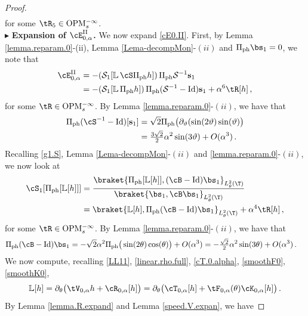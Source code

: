 \documentclass[a4paper,reqno,10pt]{article}
\newcommand{\pa}{\partial}
\newcommand{\OpM}{{\rm O}{\rm P}{\rm M}}
\newcommand{\LL}{\mathbb{L}}
\begin{document}
\begin{proof}
\begin{align}
		\end{align}
		for some $\tR_5\in\OpM_{s}^{-\infty}$. 
\\[1mm]
\noindent  $\blacktriangleright$ {\bf Expansion of $\cE_{0,\alpha}^{\rm II}$.} We now expand \eqref{cE0.II}. First, by Lemma \ref{lemma.reparam.0}-(ii), Lemma \ref{Lema-decompMon}-$(ii)$ and $\Pi_{\rm ph}\bs_{1}=0$, we note that
\begin{align}
   \cE_{0,\alpha}^{\rm II} & =- (\mathcal{S}_1[\mathbb{L}\, \cS \Pi_{\rm ph}h])\,\Pi_{\rm ph}\mathcal{S}^{-1}\mathbf{s}_1\\
   & = -(\mathcal{S}_1[\mathbb{L}\,  \Pi_{\rm ph}h])\,\Pi_{\rm ph}(\mathcal{S}^{-1}-\hbox{Id})\mathbf{s}_1+\alpha^6 \tR[h] \,, \label{II.cE}
\end{align}
for some $\tR \in\OpM_{s}^{-\infty}$. By Lemma \ref{lemma.reparam.0}-$(ii)$, we have that
    \begin{align}
      \Pi_{\rm ph}(\cS^{-1}-{\rm Id})[\mathbf{s}_1] & = \sqrt 2\Pi_{\rm ph} \big( \pa_{\vartheta} (\sin(2\vartheta)\sin(\vartheta) \big)\\
      &=\tfrac{3\sqrt{2}}{2}\alpha^2\sin(3\vartheta) +O(\alpha^3)\,. \label{SSLL1}
    \end{align}
Recalling \eqref{g1.S}, Lemma \ref{Lema-decompMon}-$(ii)$ and \ref{lemma.reparam.0}-$(ii)$, we now look at
\begin{align}
    \cS_{1}[\Pi_{\rm ph}[\LL[h]]] & =  \frac{\braket{\Pi_{\rm ph}[\LL[h]], (\cB-{\rm Id})\bs_{1}}_{L_\theta^2(\T)}}{\braket{\bs_{1},\cB \bs_{1}}_{L_\theta^2(\T)}}  \\
    & =  \braket{\LL[h], \Pi_{\rm ph}(\cB-{\rm Id})\bs_{1}}_{L_\theta^2(\T)} + \alpha^4 \tR[h] \,, \label{cS1.expand}
\end{align}
for some $\tR \in\OpM_{s}^{-\infty}$. By Lemma \ref{lemma.reparam.0}-$(ii)$, we have that
\begin{align}
    \Pi_{\rm ph}(\cB-{\rm Id})\bs_{1} & = -\sqrt 2 \alpha^{2} \Pi_{\rm ph}\big(\sin(2\theta) \cos(\theta) \big)+ O(\alpha^3) = - \tfrac{\sqrt 2}{2}\alpha^{2} \sin(3\theta)  + O(\alpha^3) \,. \label{B-Id.s1}
\end{align}
We now compute, recalling \eqref{LL11}, \eqref{linear.rho.full}, \eqref{cT.0.alpha}, \eqref{smoothF0}, \eqref{smoothK0},
\begin{equation}
    \LL[h] = \pa_{\theta}\big(\tV_{0,\alpha}h + \cR_{0,\alpha}[h]\big) = \pa_{\theta}\big( \cT_{0,\alpha}[h] + \tF_{0,\alpha}(\theta) \cK_{0,\alpha}[h] \big) \,.
\end{equation}
By Lemma \ref{lemma.R.expand} and Lemma \ref{speed.V.expan}, we have

\end{proof}
\end{document}
